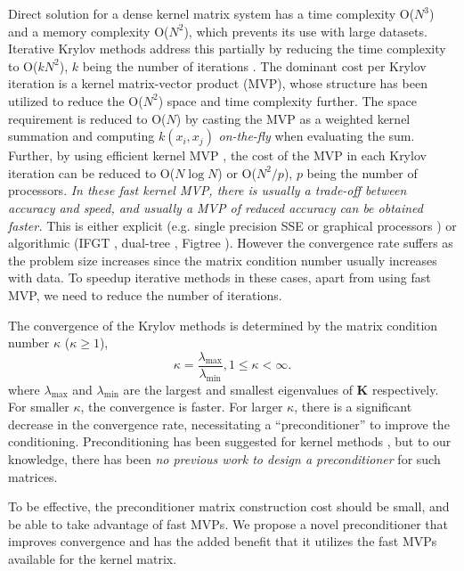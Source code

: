 \documentclass[10pt,journal,letterpaper,compsoc]{IEEEtran}
\begin{document}
Direct solution for a dense kernel matrix system has a time complexity O($N^3$) and a memory complexity O($N^2$), which prevents its use with large datasets. Iterative Krylov methods \cite{SaadIterativeMethods} address this partially by reducing the time complexity to O($kN^2$), $k$ being the number of iterations \cite{GPML_Mackay,NandoKrylov}. The dominant cost per Krylov iteration is a kernel matrix-vector product (MVP), whose structure has been utilized to reduce the O($N^2$) space and time complexity further. The space requirement is reduced to O($N$) by casting the MVP as a weighted kernel summation and computing $k(x_i,x_j)$ \emph{on-the-fly} when evaluating the sum. Further, by using efficient kernel MVP \cite{IFGT_Yang,IFGT_Raykar,DualTree,FIGTREE,GPUML}, the cost of the MVP in each Krylov iteration can be reduced to O($N\log N$) or O($N^2/p$), $p$ being the number of processors. \emph{In these fast kernel MVP, there is usually a trade-off between accuracy and speed, and usually a MVP of reduced accuracy can be obtained faster.} This is either explicit (e.g. single precision SSE or graphical processors \cite{GPUML}) or algorithmic (IFGT \cite{IFGT_Yang,IFGT_Raykar}, dual-tree \cite{DualTree}, Figtree \cite{FIGTREE}). However the convergence rate suffers as the problem size increases since the matrix condition number usually increases with data. To speedup iterative methods in these cases, apart from using fast MVP, we need to reduce the number of iterations.

The convergence of the Krylov methods is determined by the matrix condition number $\kappa$ ($\kappa\ge1$),
\begin{equation}
\kappa=\frac{\lambda_{\max}}{\lambda_{\min}}, 1\le\kappa<\infty.
\end{equation}
where $\lambda_{\max}$ and $\lambda_{\min}$ are the largest  and smallest eigenvalues of $\mathbf{K}$ respectively. For smaller $\kappa$, the convergence is faster. For larger $\kappa$, there is a significant decrease in the convergence rate, necessitating a ``preconditioner'' \cite{SaadIterativeMethods} to improve the conditioning. Preconditioning has been suggested for kernel methods \cite{NandoKrylov,MurrayKrylov}, but to our knowledge, there has been \emph{no previous work to design a preconditioner }for such matrices.

To be effective, the preconditioner matrix construction cost should be small, and be able to take advantage of fast MVPs. We propose a novel preconditioner that improves convergence and has the added benefit that it utilizes the fast MVPs available for the kernel matrix.
\end{document}
